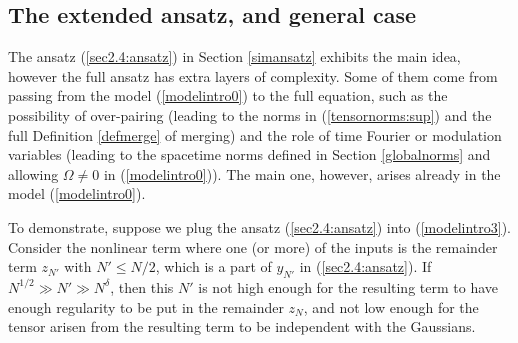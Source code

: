 \documentclass[11 pt,reqno]{amsart}
\theoremstyle{definition}
\theoremstyle{remark}
\numberwithin{equation}{section}
\begin{document}
{\subsection{The extended ansatz, and general case}\label{generalintro}
The ansatz (\ref{sec2.4:ansatz}) in Section \ref{simansatz} exhibits the main idea, however the full ansatz has extra layers of complexity. Some of them come from passing from the model (\ref{modelintro0}) to the full equation, such as the possibility of over-pairing (leading to the norms in (\ref{tensornorms:sup}) and the full Definition \ref{defmerge} of merging) and the role of time Fourier or modulation variables (leading to the spacetime norms defined in Section \ref{globalnorms} and allowing $\Omega\neq 0$ in (\ref{modelintro0})). The main one, however, arises already in the model (\ref{modelintro0}).

To demonstrate, suppose we plug the ansatz (\ref{sec2.4:ansatz}) into (\ref{modelintro3}). Consider the nonlinear term where one (or more) of the inputs is the remainder term $z_{N'}$ with $N'\leq N/2$, which is a part of $y_{N'}$ in (\ref{sec2.4:ansatz}). If $N^{1/2}\gg N'\gg N^\delta$, then this $N'$ is not high enough for the resulting term to have enough regularity to be put in the remainder $z_N$, and not low enough for the tensor arisen from the resulting term to be independent with the Gaussians.

}
\end{document}
